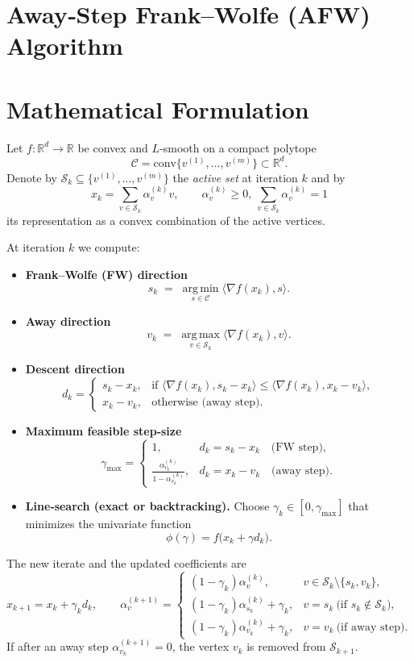 \documentclass{article}
\newcommand{\conv}{\mathrm{conv}}
\newcommand{\argmin}{\operatorname*{arg\,min}}
\newcommand{\argmax}{\operatorname*{arg\,max}}
\begin{document}
\section*{Away‑Step Frank–Wolfe (AFW) Algorithm}

\section*{Mathematical Formulation}
Let $f:\mathbb{R}^d\rightarrow\mathbb{R}$ be convex and $L$‑smooth on a compact polytope 
\[
\mathcal{C}= \conv\{v^{(1)},\dots ,v^{(m)}\}\subset\mathbb{R}^d .
\]
Denote by $\mathcal{S}_k\subseteq\{v^{(1)},\dots ,v^{(m)}\}$ the \emph{active set} at iteration $k$ and by
\[
x_k=\sum_{v\in\mathcal{S}_k}\alpha^{(k)}_v v,\qquad \alpha^{(k)}_v\ge 0,\ \sum_{v\in\mathcal{S}_k}\alpha^{(k)}_v=1
\]
its representation as a convex combination of the active vertices.  

At iteration $k$ we compute:
\begin{itemize}
    \item \textbf{Frank–Wolfe (FW) direction}
    \[
    s_k \;=\; \argmin_{s\in\mathcal{C}} \langle \nabla f(x_k),s\rangle .
    \]
    \item \textbf{Away direction}
    \[
    v_k \;=\; \argmax_{v\in\mathcal{S}_k} \langle \nabla f(x_k),v\rangle .
    \]
    \item \textbf{Descent direction}
    \[
    d_k = 
    \begin{cases}
        s_k - x_k, & \text{if } \langle \nabla f(x_k),s_k-x_k\rangle \le \langle \nabla f(x_k),x_k-v_k\rangle,\\[4pt]
        x_k - v_k, & \text{otherwise (away step).}
    \end{cases}
    \]
    \item \textbf{Maximum feasible step‑size}
    \[
    \gamma_{\max}= 
    \begin{cases}
        1, & d_k = s_k-x_k\quad\text{(FW step)},\\[4pt]
        \displaystyle\frac{\alpha^{(k)}_{v_k}}{1-\alpha^{(k)}_{v_k}}, & d_k = x_k-v_k\quad\text{(away step)} .
    \end{cases}
    \]
    \item \textbf{Line‑search (exact or backtracking).}  
    Choose $\gamma_k\in[0,\gamma_{\max}]$ that minimizes the univariate function
    \[
    \phi(\gamma)= f\bigl(x_k+\gamma d_k\bigr).
    \]
\end{itemize}
The new iterate and the updated coefficients are
\[
x_{k+1}=x_k+\gamma_k d_k,\qquad 
\alpha^{(k+1)}_v=
\begin{cases}
    (1-\gamma_k)\alpha^{(k)}_v, & v\in\mathcal{S}_k\setminus\{s_k,v_k\},\\[4pt]
    (1-\gamma_k)\alpha^{(k)}_{s_k}+\gamma_k , & v=s_k\ \text{(if }s_k\notin\mathcal{S}_k\text{)},\\[4pt]
    (1-\gamma_k)\alpha^{(k)}_{v_k}+\gamma_k , & v=v_k\ \text{(if away step)} .
\end{cases}
\]
If after an away step $\alpha^{(k+1)}_{v_k}=0$, the vertex $v_k$ is removed from $\mathcal{S}_{k+1}$.
\end{document}
